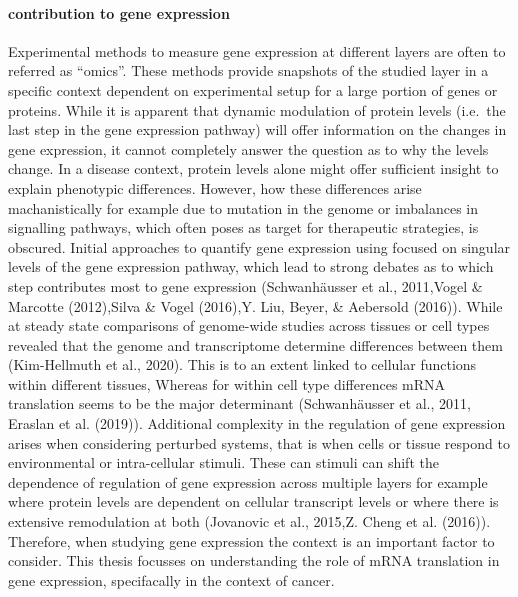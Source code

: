 \documentclass[12pt,openany]{book}
\begin{document}
\paragraph{contribution to gene expression} Experimental methods to
measure gene expression at different layers are often to referred as
``omics''. These methods provide snapshots of the studied layer in a
specific context dependent on experimental setup for a large portion of
genes or proteins. While it is apparent that dynamic modulation of
protein levels (i.e.~the last step in the gene expression pathway) will
offer information on the changes in gene expression, it cannot
completely answer the question as to why the levels change. In a disease
context, protein levels alone might offer sufficient insight to explain
phenotypic differences. However, how these differences arise
machanistically for example due to mutation in the genome or imbalances
in signalling pathways, which often poses as target for therapeutic
strategies, is obscured. Initial approaches to quantify gene expression
using focused on singular levels of the gene expression pathway, which
lead to strong debates as to which step contributes most to gene
expression (Schwanhäusser et al., 2011,Vogel \& Marcotte (2012),Silva \&
Vogel (2016),Y. Liu, Beyer, \& Aebersold (2016)). While at steady state
comparisons of genome-wide studies across tissues or cell types revealed
that the genome and transcriptome determine differences between them
(Kim-Hellmuth et al., 2020). This is to an extent linked to cellular
functions within different tissues, Whereas for within cell type
differences mRNA translation seems to be the major determinant
(Schwanhäusser et al., 2011, Eraslan et al. (2019)). Additional
complexity in the regulation of gene expression arises when considering
perturbed systems, that is when cells or tissue respond to environmental
or intra-cellular stimuli. These can stimuli can shift the dependence of
regulation of gene expression across multiple layers for example where
protein levels are dependent on cellular transcript levels or where
there is extensive remodulation at both (Jovanovic et al., 2015,Z. Cheng
et al. (2016)). Therefore, when studying gene expression the context is
an important factor to consider. This thesis focusses on understanding
the role of mRNA translation in gene expression, specifacally in the
context of cancer. \clearpage
\end{document}
